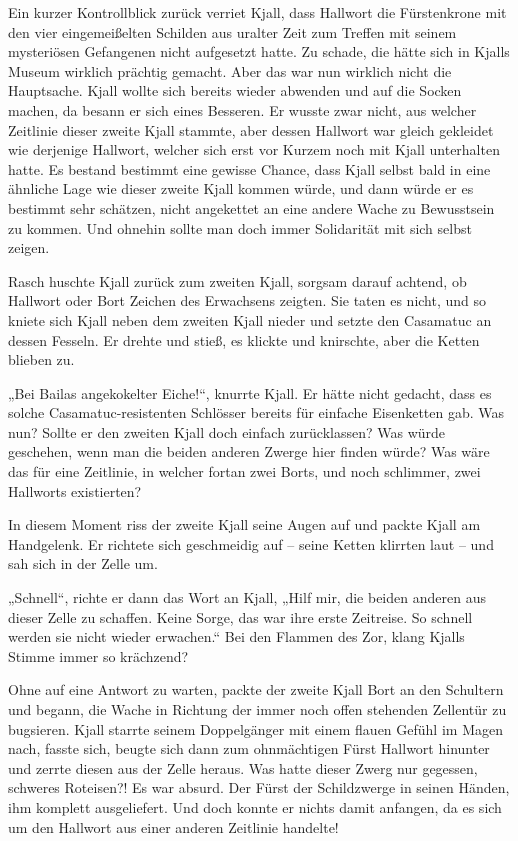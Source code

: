 Ein kurzer Kontrollblick zurück verriet Kjall, dass Hallwort die Fürstenkrone mit den vier eingemeißelten Schilden aus uralter Zeit zum Treffen mit seinem mysteriösen Gefangenen nicht aufgesetzt hatte. Zu schade, die hätte sich in Kjalls Museum wirklich prächtig gemacht. Aber das war nun wirklich nicht die Hauptsache. Kjall wollte sich bereits wieder abwenden und auf die Socken machen, da besann er sich eines Besseren. Er wusste zwar nicht, aus welcher Zeitlinie dieser zweite Kjall stammte, aber dessen Hallwort war gleich gekleidet wie derjenige Hallwort, welcher sich erst vor Kurzem noch mit Kjall unterhalten hatte. Es bestand bestimmt eine gewisse Chance, dass Kjall selbst bald in eine ähnliche Lage wie dieser zweite Kjall kommen würde, und dann würde er es bestimmt sehr schätzen, nicht angekettet an eine andere Wache zu Bewusstsein zu kommen. Und ohnehin sollte man doch immer Solidarität mit sich selbst zeigen.

Rasch huschte Kjall zurück zum zweiten Kjall, sorgsam darauf achtend, ob Hallwort oder Bort Zeichen des Erwachsens zeigten. Sie taten es nicht, und so kniete sich Kjall neben dem zweiten Kjall nieder und setzte den Casamatuc an dessen Fesseln. Er drehte und stieß, es klickte und knirschte, aber die Ketten blieben zu.

„Bei Bailas angekokelter Eiche!“, knurrte Kjall. Er hätte nicht gedacht, dass es solche Casamatuc-resistenten Schlösser bereits für einfache Eisenketten gab. Was nun? Sollte er den zweiten Kjall doch einfach zurücklassen? Was würde geschehen, wenn man die beiden anderen Zwerge hier finden würde? Was wäre das für eine Zeitlinie, in welcher fortan zwei Borts, und noch schlimmer, zwei Hallworts existierten?

In diesem Moment riss der zweite Kjall seine Augen auf und packte Kjall am Handgelenk. Er richtete sich geschmeidig auf – seine Ketten klirrten laut – und sah sich in der Zelle um.

„Schnell“, richte er dann das Wort an Kjall, „Hilf mir, die beiden anderen aus dieser Zelle zu schaffen. Keine Sorge, das war ihre erste Zeitreise. So schnell werden sie nicht wieder erwachen.“ Bei den Flammen des Zor, klang Kjalls Stimme immer so krächzend?

Ohne auf eine Antwort zu warten, packte der zweite Kjall Bort an den Schultern und begann, die Wache in Richtung der immer noch offen stehenden Zellentür zu bugsieren. Kjall starrte seinem Doppelgänger mit einem flauen Gefühl im Magen nach, fasste sich, beugte sich dann zum ohnmächtigen Fürst Hallwort hinunter und zerrte diesen aus der Zelle heraus. Was hatte dieser Zwerg nur gegessen, schweres Roteisen?! Es war absurd. Der Fürst der Schildzwerge in seinen Händen, ihm komplett ausgeliefert. Und doch konnte er nichts damit anfangen, da es sich um den Hallwort aus einer anderen Zeitlinie handelte!

